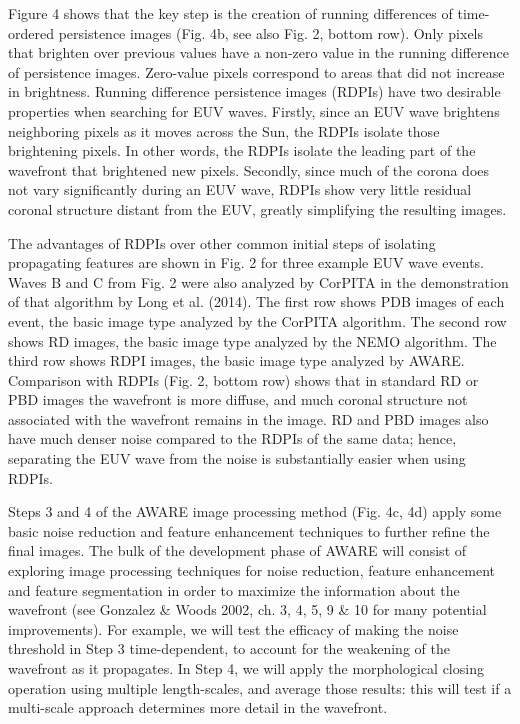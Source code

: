 Figure 4 shows that the key step is the creation of running differences of time-ordered persistence images (Fig. 4b, see also Fig. 2, bottom row).  Only pixels that brighten over previous values have a non-zero value in the running difference of persistence images.  Zero-value pixels correspond to areas that did not increase in brightness.  Running difference persistence images (RDPIs) have two desirable properties when searching for EUV waves.  Firstly, since an EUV wave brightens neighboring pixels as it moves across the Sun, the RDPIs isolate those brightening pixels.  In other words, the RDPIs isolate the leading part of the wavefront that brightened new pixels.  Secondly, since much of the corona does not vary significantly during an EUV wave, RDPIs show very little residual coronal structure distant from the EUV, greatly simplifying the resulting images.  

The advantages of RDPIs over other common initial steps of isolating propagating features are shown in Fig. 2 for three example EUV wave events. Waves B and C from Fig. 2 were also analyzed by CorPITA in the demonstration of that algorithm by Long et al. (2014).  The first row shows PDB images of each event, the basic image type analyzed by the CorPITA algorithm.  The second row shows RD images, the basic image type analyzed by the NEMO algorithm.  The third row shows RDPI images, the basic image type analyzed by AWARE. Comparison with RDPIs (Fig. 2, bottom row) shows that in standard RD or PBD images the wavefront is more diffuse, and much coronal structure not associated with the wavefront remains in the image. RD and PBD images also have much denser noise compared to the RDPIs of the same data; hence, separating the EUV wave from the noise is substantially easier when using RDPIs.   

Steps 3 and 4 of the AWARE image processing method (Fig. 4c, 4d) apply some basic noise reduction and feature enhancement techniques to further refine the final images.  The bulk of the development phase of AWARE will consist of exploring image processing techniques for noise reduction, feature enhancement and feature segmentation in order to maximize the information about the wavefront (see Gonzalez & Woods 2002, ch. 3, 4, 5, 9 & 10 for many potential improvements).  For example, we will test the efficacy of making the noise threshold in Step 3 time-dependent, to account for the weakening of the wavefront as it propagates.  In Step 4, we will apply the morphological closing operation using multiple length-scales, and average those results: this will test if a multi-scale approach determines more detail in the wavefront.

